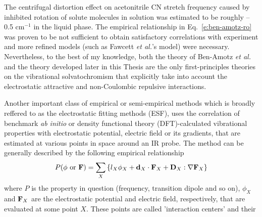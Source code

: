 \documentclass[a4paper,titlepage,twoside,fleqn,12pt]{book}
\begin{document}
\begin{refsection}
The centrifugal distortion effect on acetonitrile CN stretch frequency 
caused by inhibited rotation of solute molecules
in solution was estimated to be roughly --0.5 cm$^{-1}$ in the liquid phase.  
The empirical relationship in Eq.~\eqref{e:ben-amotz-ro} was proven to be not sufficient to obtain 
satisfactory correlations with experiment and more refined
models (such as Fawcett \emph{et al.}'s model) were necessary.\citep{Reimers.Hall.JACS.1999} 
Nevertheless, 
to the best of my knowledge, both the theory of Ben-Amotz \emph{et al.}\citep{Ben-Amotz.Lee.Cho.List.JCP.1992} 
and the theory
developed later in this Thesis are the only first-principles theories on the
vibrational solvatochromism that explicitly take into account the electrostatic 
attractive and non-Coulombic repulsive interactions.

Another important class of empirical or semi\hyp{}empirical methods which is broadly reffered 
to as the electrostatic fitting methods (ESF), uses the correlation of benchmark 
\emph{ab initio} or density functional theory (DFT)-calculated vibrational properties
with electrostatic potential, electric field or its gradients, that are estimated at various
points in space around an IR probe.\citep{Kwac.Cho.II.JCP.2003,Ham.Kim.Lee.Cho.JCP.2003,Bour.Keiderling.JCP.2003,
Schmidt.Corcelli.Skinner.JCP.2004,Corcelli.Lawrence.Skinner.JCP.2004,Hahn.Lee.Cho.JCP.2004,Kwac.Lee.Cho.JCP.2004,
Choi.Hahn.Cho.IJQC.2005,Kwac.Cho.JRS.2005,Watson.Hirst.MP.2005,
DeCamp.DeFlores.McCracken.Tokmakoff.Kwac.Cho.JPCB.2005,Hayashi.Jansen.Zhuang.Mukamel.JPCA.2005,
Hayashi.Zhuang.Mukamel.JPCA.2005,Bour.Michalik.Kapitan.JCP.2005,
Jansen.Dijkstra.Watson.Hirst.Knoester.JCP.2006,
Jansen.Knoester.JCP.2006,
Choi.Oh.Lee.Lee.Cho.JCP.2008,Oh.Choi.Lee.Han.Lee.Cho.JCP.2008,
Choi.Oh.Cho.JCP.2008,
Lin.Shorb.Mukherjee.Zanni.Skinner.JPCB.2009,Lee.Choi.Cho.PCCP.2010,Choi.Cho.JCP.2011,
Roy.Lessing.Meisl.Ganim.Tokmakoff.Knoester.Jansen.JCP.2011,Choi.Raleigh.Cho.JPCL.2011,
Lee.Choi.Cho.JCP.2012,Torii.JPCL.2015,Torii.Noge.PCCP.2016}
%
The method can be generally described by the following empirical relationship
%
\begin{equation} \label{e:esf}
 P(\phi \text{ or } {\bf F}) = \sum_X \left\{ l_X \phi_X + {\bf d}_X \cdot {\bf F}_X + {\bf D}_X : \nabla{\bf F}_X \right\}
\end{equation}
%
where $P$ is the property in question (frequency, transition dipole and so on), 
$\phi_X$ and ${\bf F}_X$ are the electrostatic potential and electric field, respectively, that are
evaluated at some point $X$.
These points are called 'interaction centers' and their

\end{refsection}
\end{document}
